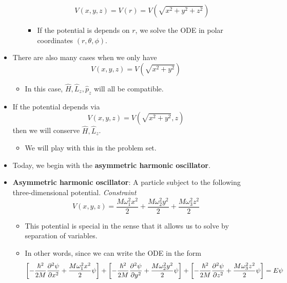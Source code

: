 \documentclass[../notes.tex]{subfiles}
\begin{document}
\begin{itemize}
\begin{itemize}
        \begin{equation*}
            V(x,y,z) = V(r) = V(\sqrt{x^2+y^2+z^2})
        \end{equation*}
        \begin{itemize}
            \item If the potential is depends on $r$, we solve the ODE in polar coordinates $(r,\theta,\phi)$.
        \end{itemize}
    \end{itemize}
    \item There are also many cases when we only have
    \begin{equation*}
        V(x,y,z) = V(\sqrt{x^2+y^2})
    \end{equation*}
    \begin{itemize}
        \item In this case, $\hat{H},\hat{L}_z,\hat{p}_z$ will all be compatible.
    \end{itemize}
    \item If the potential depends via
    \begin{equation*}
        V(x,y,z) = V(\sqrt{x^2+y^2},z)
    \end{equation*}
    then we will conserve $\hat{H},\hat{L}_z$.
    \begin{itemize}
        \item We will play with this in the problem set.
    \end{itemize}
    \pagebreak
    \item Today, we begin with the \textbf{asymmetric harmonic oscillator}.
    \item \textbf{Asymmetric harmonic oscillator}: A particle subject to the following three-dimensional potential. \emph{Constraint}
    \begin{equation*}
        V(x,y,z) = \frac{M\omega_1^2x^2}{2}+\frac{M\omega_2^2y^2}{2}+\frac{M\omega_3^2z^2}{2}
    \end{equation*}
    \begin{itemize}
        \item This potential is special in the sense that it allows us to solve by separation of variables.
        \item In other words, since we can write the ODE in the form
        \begin{equation*}
            \left[ -\frac{\hbar^2}{2M}\pdv[2]{\psi}{x}+\frac{M\omega_1^2x^2}{2}\psi \right]+\left[ -\frac{\hbar^2}{2M}\pdv[2]{\psi}{y}+\frac{M\omega_2^2y^2}{2}\psi \right]+\left[ -\frac{\hbar^2}{2M}\pdv[2]{\psi}{z}+\frac{M\omega_3^2z^2}{2}\psi \right] = E\psi

\end{equation*}
\end{itemize}
\end{itemize}
\end{document}
